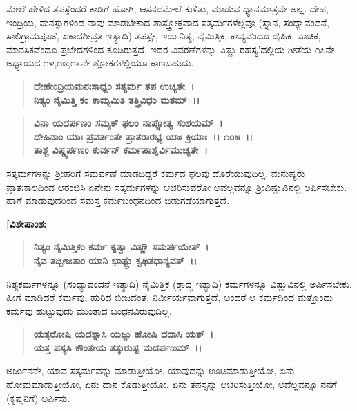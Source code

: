 ಮೇಲೆ ಹೇಳಿದ ತಪಸ್ಸೆಂದರೆ ಕಾಡಿಗೆ ಹೋಗಿ, ಆಸನದಮೇಲೆ ಕುಳಿತು, ಮಾಡುವ ಧ್ಯಾನಮಾತ್ರವೇ ಅಲ್ಲ. ದೇಹ, ಇಂದ್ರಿಯ, ಮನಸ್ಸುಗಳಿಂದ ನಾವು ಮಾಡಬೇಕಾದ ಶಾಸ್ತ್ರೋಕ್ತವಾದ ಸತ್ಕರ್ಮಗಳೆಲ್ಲವೂ (ಸ್ನಾನ, ಸಂಧ್ಯಾವಂದನೆ, ಸಾಲಿಗ್ರಾಮಪೂಜೆ, ಏಕಾದಶೀವ್ರತ ಇತ್ಯಾದಿ) ತಪಸ್ಸೇ, ಇದು ನಿತ್ಯ, ನೈಮಿತ್ತಿಕ, ಕಾವ್ಯವೆಂದೂ ದೈಹಿಕ, ವಾಚಿಕ, ಮಾನಸಿಕವೆಂದೂ ಪ್ರಭೇದಗಳಿಂದ ಕೂಡಿರುತ್ತದೆ. ಇದರ ವಿವರಣೆಗಳನ್ನು ವಿಷ್ಣು ರಹಸ್ಯ'ದಲ್ಲಿಯ ಗೀತೆಯ ೧೭ನೇ ಅಧ್ಯಾಯದ ೧೪,೧೫,೧೬ನೇ ಶ್ಲೋಕಗಳಲ್ಲಿಯೂ ಕಾಣಬಹುದು.

\begin{verse}
\textbf{ದೇಹೇಂದ್ರಿಯಮನಃಸಾಧ್ಯಂ ಸತ್ಯರ್ಮ ತಪ ಉಚ್ಯತೇ~।}\\\textbf{ನಿತ್ಯಂ ನೈಮಿತ್ತಿ ಕಂ ಕಾಮ್ಯಮಿತಿ ತತ್ತ್ರಿವಿಧಂ ಮತಮ್~।।} 
\end{verse}

\begin{verse}
\textbf{ವಿನಾ ಯದರ್ಪಣಂ ಸಮ್ಯಕ್ ಫಲಂ ನಾಪ್ನೋತ್ಯ ಸಂಶಯಮ್~।}\\\textbf{ದೇಹಿನಾಂ ಯಾಃ ಪ್ರವರ್ತಂತೇ ಪ್ರಾತರಾರಭ್ಯ ಯಾಃ ಕ್ರಿಯಾಃ~।। ೧೦೫~।।}\\\textbf{ತಾಶ್ಚ ವಿಷ್ಣ್ವರ್ಪಣಂ ಕುರ್ವನ್‌ ಕರ್ಮಪಾಶೈರ್ವಿಮುಚ್ಯತೇ~।}
\end{verse}

ಸತ್ಕರ್ಮಗಳನ್ನು ಶ‍್ರೀಹರಿಗೆ ಸಮರ್ಪಣೆ ಮಾಡದಿದ್ದರೆ ಕರ್ಮದ ಫಲವು ದೊರೆಯುವುದಿಲ್ಲ. ಮನುಷ್ಯರು ಪ್ರಾತಃಕಾಲದಿಂದ ಆರಂಭಿಸಿ ಏನೇನು ಸತ್ಕರ್ಮಗಳನ್ನು ಆಚರಿಸುವರೋ ಅವೆಲ್ಲವನ್ನೂ ಶ‍್ರೀವಿಷ್ಣುವಿನಲ್ಲಿ ಅರ್ಪಿಸಬೇಕು. ಹಾಗೆ ಮಾಡುವುದರಿಂದ ಸಮಸ್ತ ಕರ್ಮಬಂಧನದಿಂದ ಬಿಡುಗಡೆಯಾಗುತ್ತದೆ.

\begin{flushleft}
\textbf{[ವಿಶೇಷಾಂಶ:}
\end{flushleft}

\begin{verse}
\textbf{ನಿತ್ಯಂ ನೈಮಿತ್ತಿಕಂ ಕರ್ಮ ಕೃತ್ವಾ ವಿಷ್ಣೌ ಸಮರ್ಪಯೇತ್~।}\\\textbf{ನೈವ ತದ್ಬೀಜತಾಂ ಯಾನಿ ಭಾಷ್ಟ್ರು ಕ್ವಥಿತಧಾನ್ಯವತ್~।।} 
\end{verse}

ನಿತ್ಯಕರ್ಮಗಳನ್ನೂ (ಸಂಧ್ಯಾವಂದನೆ ಇತ್ಯಾದಿ) ನೈಮಿತ್ತಿಕ (ಶ್ರಾದ್ಧ ಇತ್ಯಾದಿ) ಕರ್ಮಗಳನ್ನೂ ವಿಷ್ಣುವಿನಲ್ಲಿ ಅರ್ಪಿಸಬೇಕು. ಹೀಗೆ ಮಾಡಿದರೆ ಕರ್ಮವು, ಹುರಿದ ಬೀಜದಂತೆ, ನಿರ್ವೀರ್ಯವಾಗುತ್ತದೆ, ಅಂದರೆ ಆ ಕರ್ಮದಿಂದ ಮತ್ತೊಂದು ಕರ್ಮವು ಹುಟ್ಟುವುದು ಮುಂತಾದ ಬಂಧನವಿರುವುದಿಲ್ಲ.

\begin{verse}
\textbf{ಯತ್ಕರೋಷಿ ಯದಶ್ನಾಸಿ ಯಜ್ಜು ಹೋಷಿ ದದಾಸಿ ಯತ್~।}\\\textbf{ಯತ್ತ ಪಸ್ಯಸಿ ಕೌಂತೇಯ ತತ್ಕುರುಷ್ಟ ಮದರ್ಪಣಮ್~।।} 
\end{verse}

ಅರ್ಜುನನೇ, ಯಾವ ಸತ್ಕರ್ಮವನ್ನು ಮಾಡುತ್ತೀಯೋ, ಯಾವುದನ್ನು ಊಟಮಾಡು\-ತ್ತೀಯೋ, ಏನು ಹೋಮಮಾಡುತ್ತೀಯೋ, ಏನು ದಾನ ಕೊಡುತ್ತೀಯೋ, ಏನು ತಪಸ್ಸನ್ನು ಆಚರಿಸುತ್ತೀಯೋ, ಅದೆಲ್ಲವನ್ನೂ ನನಗೆ (ಕೃಷ್ಣನಿಗೆ) ಅರ್ಪಿಸು.

